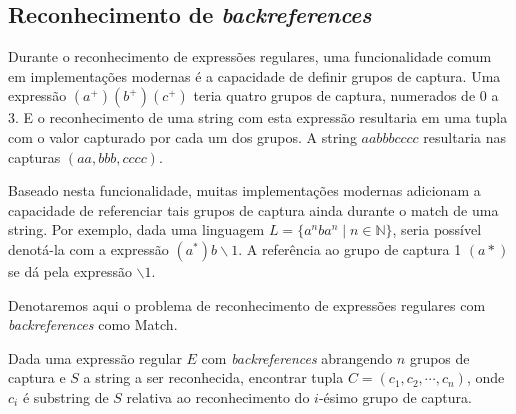 \documentclass[a4paper,12pt,oneside,onecolumn]{uerj}
\newenvironment{definition}[1]{\noindent\hrulefill \begin{trivlist}
\item[\hskip \labelsep \textsc{#1}:]}{\end{trivlist}\noindent\hrulefill}
\begin{document}
\subsection{Reconhecimento de \emph{backreferences}}

Durante o reconhecimento de expressões regulares, uma funcionalidade comum em implementações modernas é a capacidade de definir grupos de captura. Uma expressão $(a^+)(b^+)(c^+)$ teria quatro grupos de captura, numerados de 0 a 3. E o reconhecimento de uma string com esta expressão resultaria em uma tupla com o valor capturado por cada um dos grupos. A string $aabbbcccc$ resultaria nas capturas $(aa, bbb, cccc)$.

Baseado nesta funcionalidade, muitas implementações modernas adicionam a capacidade de referenciar tais grupos de captura ainda durante o match de uma string. Por exemplo, dada uma linguagem $L = \{a^nba^n \mid n \in \mathbb{N}\}$, seria possível denotá-la com a expressão $(a^*)b \backslash 1$. A referência ao grupo de captura 1 $(a*)$ se dá pela expressão $\backslash 1$.

Denotaremos aqui o problema de reconhecimento de expressões regulares com \emph{backreferences} como {\sc Match}.


\begin{definition}{Match}
Dada uma expressão regular $E$ com \emph{backreferences} abrangendo $n$ grupos de captura e $S$ a string a ser reconhecida, encontrar tupla $C = (c_1, c_2, \cdots, c_n)$, onde $c_i$ é substring de $S$ relativa ao reconhecimento do $i$-ésimo grupo de captura.
\end{definition}
\end{document}
